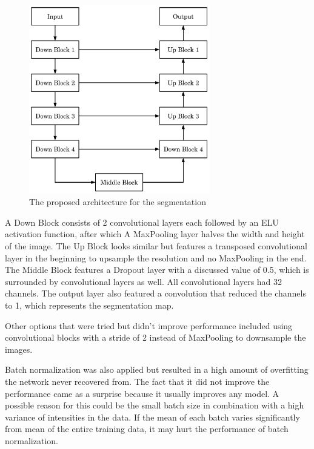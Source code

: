 \begin{figure}[H]
\centering
\par
\includegraphics[width=0.7\textwidth]{imgs/model.png}
\caption{The proposed architecture for the segmentation}
\par
\end{figure}

A Down Block consists of 2 convolutional layers each followed by an ELU activation function, after which A MaxPooling layer halves the width and height of the image. The Up Block looks similar but features a transposed convolutional layer in the beginning to upsample the resolution and no MaxPooling in the end. The Middle Block features a Dropout layer with a discussed value of 0.5, which is surrounded by convolutional layers as well. All convolutional layers had 32 channels. The output layer also featured a convolution that reduced the channels to 1, which represents the segmentation map.

Other options that were tried but didn't improve performance included using convolutional blocks with a stride of 2 instead of MaxPooling to downsample the images. 

Batch normalization was also applied but resulted in a high amount of overfitting the network never recovered from. The fact that it did not improve the performance came as a surprise because it usually improves any model. A possible reason for this could be the small batch size in combination with a high variance of intensities in the data. If the mean of each batch varies significantly from mean of the entire training data, it may hurt the performance of batch normalization.

\newpage
